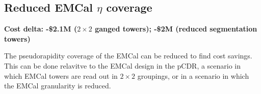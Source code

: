 
\subsection{Reduced EMCal $\eta$ coverage}
\label{sec:reduced-emcal-eta}

\textbf{Cost delta: -\$2.1M ($2\times 2$ ganged towers); -\$2M
  (reduced segmentation towers)}

The pseudorapidity coverage of the EMCal can be reduced to find cost
savings. This can be done relavitve to the EMCal design in the pCDR, a
scenario in which EMCal towers are read out in $2\times 2$ groupings,
or in a scenario in which the EMCal granularity is reduced.  

